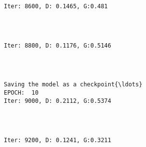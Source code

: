 \documentclass[11pt]{article}
\begin{document}
    \begin{Verbatim}[commandchars=\\\{\}]

Iter: 8600, D: 0.1465, G:0.481
    \end{Verbatim}

    \begin{center}
    \end{center}
    { \hspace*{\fill} \\}
    
    \begin{Verbatim}[commandchars=\\\{\}]

Iter: 8800, D: 0.1176, G:0.5146
    \end{Verbatim}

    \begin{center}
    \end{center}
    { \hspace*{\fill} \\}
    
    \begin{Verbatim}[commandchars=\\\{\}]

Saving the model as a checkpoint{\ldots}
EPOCH:  10
Iter: 9000, D: 0.2112, G:0.5374
    \end{Verbatim}

    \begin{center}
    \end{center}
    { \hspace*{\fill} \\}
    
    \begin{Verbatim}[commandchars=\\\{\}]

Iter: 9200, D: 0.1241, G:0.3211
    \end{Verbatim}

    \begin{center}
    \end{center}
    { \hspace*{\fill} \\}
    
\end{document}
